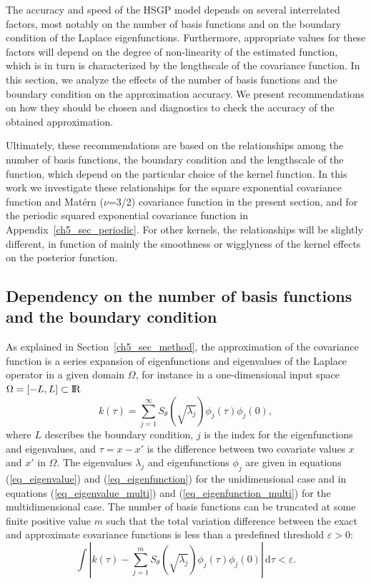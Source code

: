 \documentclass[onecolumn,a4paper,11pt]{article}
\begin{document}
The accuracy and speed of the HSGP model depends on several interrelated factors, most notably on the number of basis functions and on the boundary condition of the Laplace eigenfunctions. Furthermore, appropriate values for these factors will depend on the degree of non-linearity of the estimated function, which is in turn is characterized by the lengthscale of the covariance function. In this section, we analyze the effects of the number of basis functions and the boundary condition on the approximation accuracy. We present recommendations on how they should be chosen and diagnostics to check the accuracy of the obtained approximation. 

Ultimately, these recommendations are based on the relationships among the number of basis functions, the boundary condition and the lengthscale of the function, which depend on the particular choice of the kernel function. In this work we investigate these relationships for the square exponential covariance function and Mat{\'e}rn ($\nu$=3/2) covariance function in the present section, and for the periodic squared exponential covariance function in Appendix~\ref{ch5_sec_periodic}. For other kernels, the relationships will be slightly different, in function of mainly the smoothness or wigglyness of the kernel effects on the posterior function.

\subsection{Dependency on the number of basis functions and the boundary condition} \label{ch5_subsec_dependency}

As explained in Section~\ref{ch5_sec_method}, the approximation of the covariance function is a series expansion of eigenfunctions and eigenvalues of the Laplace operator in a given domain $\Omega$, for instance in a one-dimensional input space $\Omega=[-L,L]\subset {\rm I\!R}$
%
\begin{equation*}
k(\tau) = \sum_{j=1}^{\infty} S_{\theta}(\sqrt{\lambda_j}) \phi_j(\tau) \phi_j(0), 
\end{equation*}
%
where $L$ describes the boundary condition, $j$ is the index for the eigenfunctions and eigenvalues, and $\tau=x-x'$ is the difference between two covariate values $x$ and $x'$ in $\Omega$. The eigenvalues $\lambda_j$ and eigenfunctions $\phi_j$ are given in equations (\ref{eq_eigenvalue}) and (\ref{eq_eigenfunction}) for the unidimensional case and in equations (\ref{eq_eigenvalue_multi}) and (\ref{eq_eigenfunction_multi}) for the multidimensional case. The number of basis functions can be truncated at some finite positive value $m$ such that the total variation difference between the exact and approximate covariance functions is less than a predefined threshold $\varepsilon > 0$:
%
\begin{equation}\label{eq_diff_covs}
 \int | k(\tau) - \sum_{j=1}^m S_{\theta}(\sqrt{\lambda_j}) \phi_j(\tau) \phi_j(0)|  \,\mathrm{d}\tau  < \varepsilon.
\end{equation}
\end{document}

